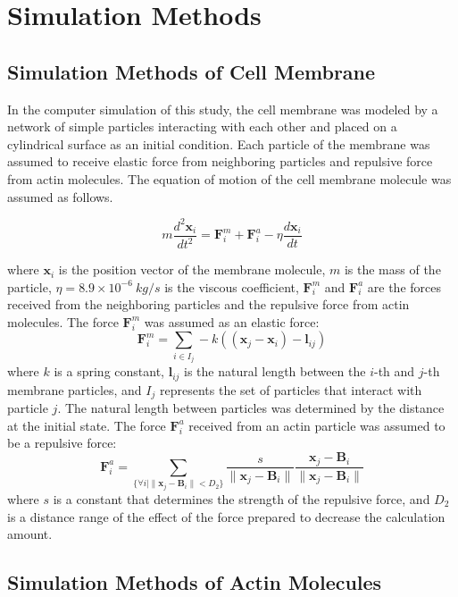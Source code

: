 \documentclass[a4paper,12pt, oneside]{book}
\begin{document}
\chapter{Simulation Methods}
\section{Simulation Methods of Cell Membrane}
In the computer simulation of this study, the cell membrane was modeled by a network of simple particles interacting with each other and placed on a cylindrical surface as an initial condition.
Each particle of the membrane was assumed to receive elastic force from neighboring particles and repulsive force from actin molecules.
The equation of motion of the cell membrane molecule was assumed as follows.

\begin{equation}
m\frac{d^2\bm{x}_i}{dt^2} = \bm{F}^m_i +  \bm{F}^a_i - \eta \frac{d\bm{x}_i}{dt}
\end{equation}

where  $\bm{x}_i$ is the position vector of the membrane molecule, $m$ is the mass of the particle, $\eta=8.9\times10^{-6}\si{~kg/s}$ is the viscous coefficient, $\bm{F}^m_i$ and $\bm{F}^a_i$ are the forces received from the neighboring particles and  the repulsive force from actin molecules.
The force  $\bm{F}^m_i$ was assumed as an elastic force:
\begin{equation}
\bm{F}^m_i = \sum_{i \in I_j}  -k((\bm{x}_j -\bm{x}_i )-\bm{l}_{ij} )
\end{equation}
where $k$ is a spring constant, $\bm{l}_{ij}$ is the natural length between the $i$-th and $j$-th membrane particles, and $I_j$ represents the set of particles that interact with particle $j$.
The natural length between particles was determined by the distance  at the initial state.
The force $\bm{F}^a_i$ received from an actin particle was assumed to be a  repulsive force:
\begin{equation}
\bm{F}^a_i = \sum_{\{ \forall i | \| \bm{x}_j - \bm{B}_i \|<D_2\}} \frac{s}{\|\bm{x}_j -\bm{B}_i \|} \frac{\bm{x}_j -\bm{B}_i }{\|\bm{x}_j -\bm{B}_i \|}
\end{equation}
where $s$ is a constant that determines the strength of the repulsive force, and $D_2$ is a distance range of the effect of the force prepared to decrease the calculation amount.

\section{Simulation Methods of Actin Molecules}
\end{document}

